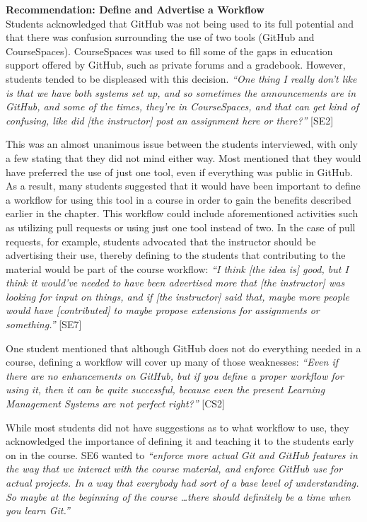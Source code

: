 \textbf{Recommendation: Define and Advertise a Workflow} \\
Students acknowledged that GitHub was not being used to its full potential and that there was confusion surrounding the use of two tools (GitHub and CourseSpaces). CourseSpaces was used to fill some of the gaps in education support offered by GitHub, such as private forums and a gradebook. However, students tended to be displeased with this decision. \textit{``One thing I really don't like is that we have both systems set up, and so sometimes the announcements are in GitHub, and some of the times, they're in CourseSpaces, and that can get kind of confusing, like did [the instructor] post an assignment here or there?''} [SE2]

This was an almost unanimous issue between the students interviewed, with only a few stating that they did not mind either way. Most mentioned that they would have preferred the use of just one tool, even if everything was public in GitHub. As a result, many students suggested that it would have been important to define a workflow for using this tool in a course in order to gain the benefits described earlier in the chapter. This workflow could include aforementioned activities such as utilizing pull requests or using just one tool instead of two. In the case of pull requests, for example, students advocated that the instructor should be advertising their use, thereby defining to the students that contributing to the material would be part of the course workflow: \textit{``I think [the idea is] good, but I think it would've needed to have been advertised more that [the instructor] was looking for input on things, and if [the instructor] said that, maybe more people would have [contributed] to maybe propose extensions for assignments or something.''} [SE7]

One student mentioned that although GitHub does not do everything needed in a course, defining a workflow will cover up many of those weaknesses: \textit{``Even if there are no enhancements on GitHub, but if you define a proper workflow for using it, then it can be quite successful, because even the present Learning Management Systems are not perfect right?''} [CS2]

While most students did not have suggestions as to what workflow to use, they acknowledged the importance of defining it and teaching it to the students early on in the course. SE6 wanted to \textit{``enforce more actual Git and GitHub features in the way that we interact with the course material, and enforce GitHub use for actual projects. In a way that everybody had sort of a base level of understanding. So maybe at the beginning of the course \ldots there should definitely be a time when you learn Git.''}

